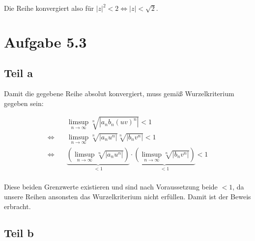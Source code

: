 \documentclass[a4paper,german,12pt,smallheadings]{scrartcl}
\begin{document}
Die Reihe konvergiert also für $|z|^2 < 2 \Leftrightarrow |z| < \sqrt{2}$.

\section*{Aufgabe 5.3}
\subsection*{Teil a}

Damit die gegebene Reihe absolut konvergiert, muss gemäß Wurzelkriterium gegeben sein:

\begin{align*}
  &\limsup_{n \to \infty} \sqrt[n]{|a_nb_n(uv)^n|} < 1 \\
 \Leftrightarrow\quad&\limsup_{n \to \infty} \sqrt[n]{|a_nu^n|} \sqrt[n]{|b_nv^n|} < 1 \\
 \Leftrightarrow\quad&\underbrace{\left(\limsup_{n \to \infty} \sqrt[n]{|a_nu^n|}\right)}_{<1} \cdot \underbrace{\left(\limsup_{n \to \infty} \sqrt[n]{|b_nv^n|}\right)}_{<1} < 1 \\
\end{align*}

Diese beiden Grenzwerte existieren und sind nach Voraussetzung beide $<1$, da unsere Reihen ansonsten das Wurzelkriterium nicht erfüllen. Damit ist der Beweis erbracht.

\subsection*{Teil b}
\end{document}
